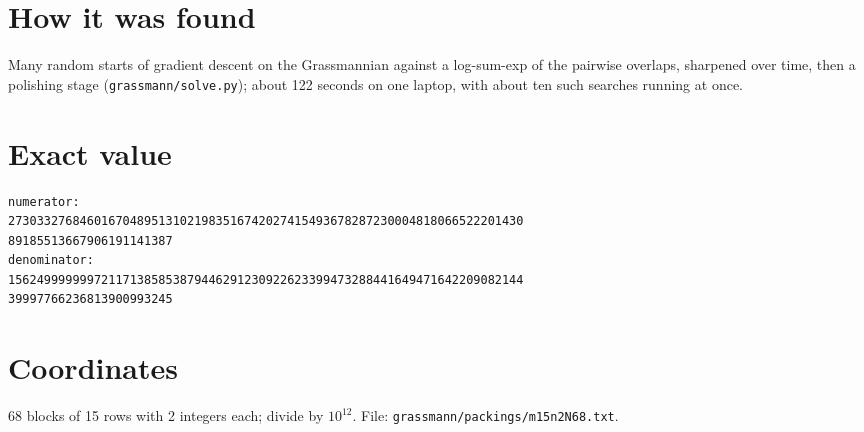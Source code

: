 \documentclass[11pt,a4paper]{article}
\begin{document}
\section{How it was found}
Many random starts of gradient descent on the Grassmannian against a log-sum-exp of the pairwise overlaps, sharpened over time, then a polishing stage (\texttt{grassmann/solve.py}); about 122 seconds on one laptop, with about ten such searches running at once.


\appendix
\section{Exact value}
{\small
\begin{verbatim}
numerator:
273033276846016704895131021983516742027415493678287230004818066522201430
89185513667906191141387
denominator:
156249999999721171385853879446291230922623399473288441649471642209082144
39997766236813900993245
\end{verbatim}}

\section{Coordinates}
68 blocks of 15 rows with 2 integers each; divide by $10^{12}$. File: \texttt{grassmann/packings/m15n2N68.txt}.
{\tiny
\begin{multicols}{4}
\end{multicols}}
\end{document}
